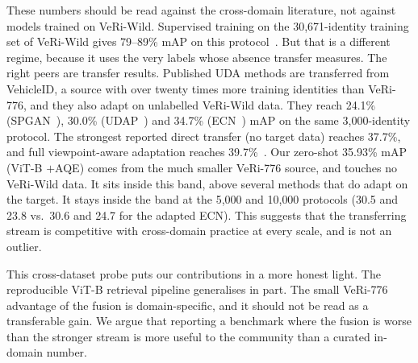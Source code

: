 These numbers should be read against the cross-domain literature, not against models trained on VeRi-Wild. Supervised training on the 30{,}671-identity training set of VeRi-Wild gives 79--89\% mAP on this protocol~\cite{lou2019veriwild,lu2025clipsenet,benmabrouk2026genlimits}. But that is a different regime, because it uses the very labels whose absence transfer measures. The right peers are transfer results. Published UDA methods are transferred from VehicleID, a source with over twenty times more training identities than VeRi-776, and they also adapt on unlabelled VeRi-Wild data. They reach 24.1\% (SPGAN~\cite{deng2018spgan}), 30.0\% (UDAP~\cite{song2020udap}) and 34.7\% (ECN~\cite{zhong2019ecn}) mAP on the same 3{,}000-identity protocol. The strongest reported direct transfer (no target data) reaches 37.7\%, and full viewpoint-aware adaptation reaches 39.7\%~\cite{zheng2020vapc}. Our zero-shot 35.93\% mAP (ViT-B $+$AQE) comes from the much smaller VeRi-776 source, and touches no VeRi-Wild data. It sits inside this band, above several methods that do adapt on the target. It stays inside the band at the 5{,}000 and 10{,}000 protocols (30.5 and 23.8 vs.\ 30.6 and 24.7 for the adapted ECN). This suggests that the transferring stream is competitive with cross-domain practice at every scale, and is not an outlier.

This cross-dataset probe puts our contributions in a more honest light. The reproducible ViT-B retrieval pipeline generalises in part. The small VeRi-776 advantage of the fusion is domain-specific, and it should not be read as a transferable gain. We argue that reporting a benchmark where the fusion is worse than the stronger stream is more useful to the community than a curated in-domain number.
